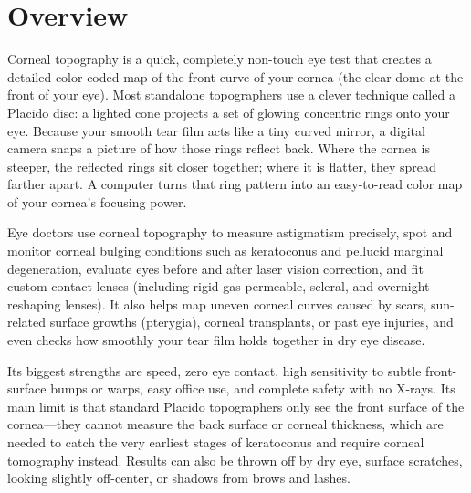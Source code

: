 \label{ch:infographic-corneal-topography}

\section{Overview}

Corneal topography is a quick, completely non-touch eye test that creates a detailed color-coded map of the front curve of your cornea (the clear dome at the front of your eye). Most standalone topographers use a clever technique called a Placido disc: a lighted cone projects a set of glowing concentric rings onto your eye. Because your smooth tear film acts like a tiny curved mirror, a digital camera snaps a picture of how those rings reflect back. Where the cornea is steeper, the reflected rings sit closer together; where it is flatter, they spread farther apart. A computer turns that ring pattern into an easy-to-read color map of your cornea's focusing power.

Eye doctors use corneal topography to measure astigmatism precisely, spot and monitor corneal bulging conditions such as keratoconus and pellucid marginal degeneration, evaluate eyes before and after laser vision correction, and fit custom contact lenses (including rigid gas-permeable, scleral, and overnight reshaping lenses). It also helps map uneven corneal curves caused by scars, sun-related surface growths (pterygia), corneal transplants, or past eye injuries, and even checks how smoothly your tear film holds together in dry eye disease.

Its biggest strengths are speed, zero eye contact, high sensitivity to subtle front-surface bumps or warps, easy office use, and complete safety with no X-rays. Its main limit is that standard Placido topographers only see the front surface of the cornea---they cannot measure the back surface or corneal thickness, which are needed to catch the very earliest stages of keratoconus and require corneal tomography instead. Results can also be thrown off by dry eye, surface scratches, looking slightly off-center, or shadows from brows and lashes.

